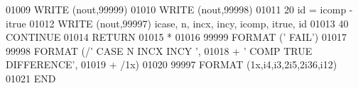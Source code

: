 \begin{DoxyCode}
01009       \textcolor{keyword}{WRITE} (nout,99999)
01010       \textcolor{keyword}{WRITE} (nout,99998)
01011    20 id = icomp - itrue
01012       \textcolor{keyword}{WRITE} (nout,99997) icase, n, incx, incy, icomp, itrue, id
01013    40 \textcolor{keywordflow}{CONTINUE}
01014       \textcolor{keywordflow}{RETURN}
01015 \textcolor{comment}{*}
01016 99999 \textcolor{keyword}{FORMAT} (\textcolor{stringliteral}{'                                       FAIL'})
01017 99998 \textcolor{keyword}{FORMAT} (/\textcolor{stringliteral}{' CASE  N INCX INCY                               '},
01018      +       \textcolor{stringliteral}{' COMP                                TRUE     DIFFERENCE'},
01019      +       /1x)
01020 99997 \textcolor{keyword}{FORMAT} (1x,i4,i3,2i5,2i36,i12)
01021 \textcolor{keyword}{      END}
\end{DoxyCode}
